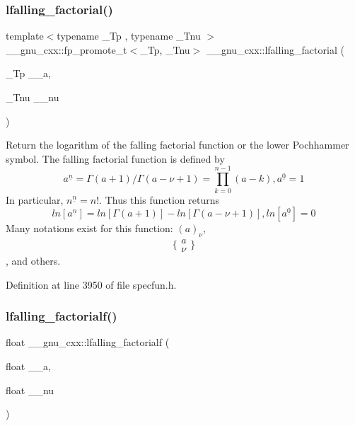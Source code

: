 \subsubsection{\texorpdfstring{lfalling\+\_\+factorial()}{lfalling\_factorial()}}
{\footnotesize\ttfamily template$<$typename \+\_\+\+Tp , typename \+\_\+\+Tnu $>$ \\
\+\_\+\+\_\+gnu\+\_\+cxx\+::fp\+\_\+promote\+\_\+t$<$\+\_\+\+Tp, \+\_\+\+Tnu$>$ \+\_\+\+\_\+gnu\+\_\+cxx\+::lfalling\+\_\+factorial (\begin{DoxyParamCaption}\item[{\+\_\+\+Tp}]{\+\_\+\+\_\+a,  }\item[{\+\_\+\+Tnu}]{\+\_\+\+\_\+nu }\end{DoxyParamCaption})\hspace{0.3cm}{\ttfamily [inline]}}



Return the logarithm of the falling factorial function or the lower Pochhammer symbol. The falling factorial function is defined by \[ a^{\underline{n}} = \Gamma(a + 1) / \Gamma(a - \nu + 1) = \prod_{k=0}^{n-1} (a - k), a^{\underline{0}} = 1 \] In particular, $ n^{\underline{n}} = n! $. Thus this function returns \[ ln[a^{\underline{n}}] = ln[\Gamma(a + 1)] - ln[\Gamma(a - \nu + 1)], ln[a^{\underline{0}}] = 0 \] Many notations exist for this function\+: $ (a)_\nu $, \[ \{ \begin{array}{c} a \\ \nu \end{array} \} \], and others. 



Definition at line 3950 of file specfun.\+h.

\mbox{\label{group__gnu__math__spec__func_ga59ad7045c90aa1e3bc671e2eb6b8a2a7}} 
\subsubsection{\texorpdfstring{lfalling\+\_\+factorialf()}{lfalling\_factorialf()}}
{\footnotesize\ttfamily float \+\_\+\+\_\+gnu\+\_\+cxx\+::lfalling\+\_\+factorialf (\begin{DoxyParamCaption}\item[{float}]{\+\_\+\+\_\+a,  }\item[{float}]{\+\_\+\+\_\+nu }\end{DoxyParamCaption})\hspace{0.3cm}{\ttfamily [inline]}}

